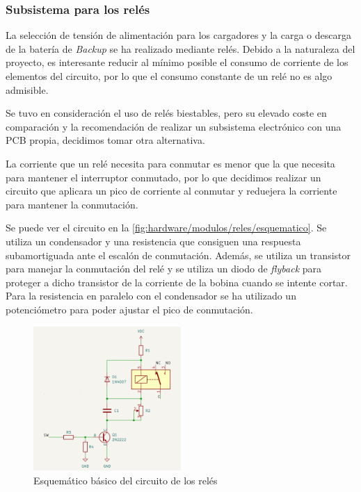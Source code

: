 \subsubsection{Subsistema para los relés}\label{subsubsec:hardware/circuito-reles}

La selección de tensión de alimentación para los cargadores y la carga o descarga de la batería de \textit{Backup} se ha realizado mediante relés. Debido a la naturaleza del proyecto, es interesante reducir al mínimo posible el consumo de corriente de los elementos del circuito, por lo que el consumo constante de un relé no es algo admisible.

Se tuvo en consideración el uso de relés biestables, pero su elevado coste en comparación y la recomendación de realizar un subsistema electrónico con una PCB propia, decidimos tomar otra alternativa. 

La corriente que un relé necesita para conmutar es menor que la que necesita para mantener el interruptor conmutado, por lo que decidimos realizar un circuito que aplicara un pico de corriente al conmutar y reduejera la corriente para mantener la conmutación. 

Se puede ver el circuito en la \autoref{fig:hardware/modulos/reles/esquematico}. Se utiliza un condensador y una resistencia que consiguen una respuesta subamortiguada ante el escalón de conmutación. Además, se utiliza un transistor para manejar la conmutación del relé y se utiliza un diodo de \textit{flyback} para proteger a dicho transistor de la corriente de la bobina cuando se intente cortar. Para la resistencia en paralelo con el condensador se ha utilizado un potenciómetro para poder ajustar el pico de conmutación. 

\begin{figure}[H]
    \centering
    \includegraphics[width=0.5\textwidth]{images/2-hardware/componentes/rele/circuitoRele.png}
    \caption{Esquemático básico del circuito de los relés}
    \label{fig:hardware/modulos/reles/esquematico}
\end{figure}

